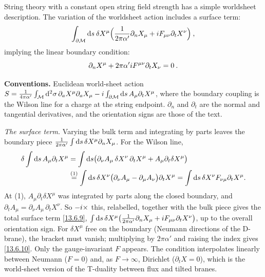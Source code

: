 String theory with a constant open string field strength has a simple worldsheet description. The variation of the worldsheet action includes a surface term:
\begin{equation}
	\int_{\partial\mathcal{M}}\mathrm{d} s\:\delta X^\mu\Bigl(\frac{1}{2\pi\alpha'}\partial_n X_\mu + i F_{\mu\nu}\partial_t X^\nu\Bigr) \:, \label{13.6.9}
\end{equation}
implying the linear boundary condition:
\begin{equation}
	\partial_n X^\mu + 2\pi\alpha'i F^{\mu\nu}\partial_t X_\nu = 0 \:. \label{13.6.10}
\end{equation}
\begin{tcolorbox}[breakable]
	\begin{remark}
		\textbf{Conventions.} Euclidean world-sheet action $S=\frac{1}{4\pi\alpha'}\int_{\mathcal M}\mathrm{d}^2\sigma\,\partial_aX^\mu\partial_aX_\mu-i\int_{\partial\mathcal M}\mathrm{d} s\,A_\mu\partial_tX^\mu$, where the boundary coupling is the Wilson line for a charge at the string endpoint. $\partial_n$ and $\partial_t$ are the normal and tangential derivatives, and the orientation signs are those of the text.

		\textit{The surface term.} Varying the bulk term and integrating by parts leaves the boundary piece $\frac{1}{2\pi\alpha'}\int\mathrm{d} s\,\delta X^\mu\partial_nX_\mu$. For the Wilson line,
		\begin{align*}
			\delta\int\mathrm{d} s\,A_\mu\partial_tX^\mu &= \int\mathrm{d} s\bigl(\partial_\nu A_\mu\,\delta X^\nu\,\partial_tX^\mu+A_\mu\partial_t\delta X^\mu\bigr)\\
			&\overset{(1)}{=} \int\mathrm{d} s\,\delta X^\nu\bigl(\partial_\nu A_\mu-\partial_\mu A_\nu\bigr)\partial_tX^\mu = \int\mathrm{d} s\,\delta X^\nu F_{\nu\mu}\partial_tX^\mu .
		\end{align*}
		At (1), $A_\mu\partial_t\delta X^\mu$ was integrated by parts along the closed boundary, and $\partial_tA_\mu=\partial_\nu A_\mu\,\partial_tX^\nu$. So $-i\times$ this, relabelled, together with the bulk piece gives the total surface term \eqref{13.6.9}, $\int\mathrm{d} s\,\delta X^\mu\bigl(\frac{1}{2\pi\alpha'}\partial_nX_\mu+i F_{\mu\nu}\partial_tX^\nu\bigr)$, up to the overall orientation sign. For $\delta X^\mu$ free on the boundary (Neumann directions of the D-brane), the bracket must vanish; multiplying by $2\pi\alpha'$ and raising the index gives \eqref{13.6.10}. Only the gauge-invariant $F$ appears. The condition interpolates linearly between Neumann ($F=0$) and, as $F\to\infty$, Dirichlet ($\partial_tX=0$), which is the world-sheet version of the T-duality between flux and tilted branes.
	\end{remark}
\end{tcolorbox}

